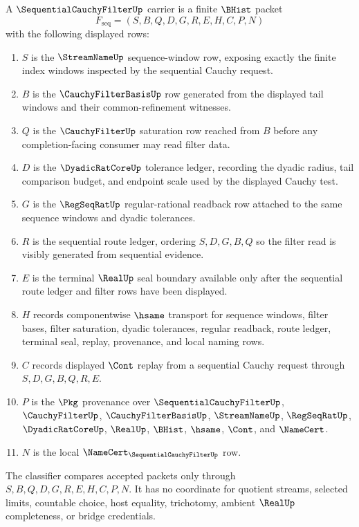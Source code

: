 \begin{definition}
\label{def:sequential-cauchy-filter-carrier}
A $\SequentialCauchyFilterUp$ carrier is a finite $\BHist$ packet
$$
F_{\mathrm{seq}}=(S,B,Q,D,G,R,E,H,C,P,N)
$$
with the following displayed rows:
\begin{enumerate}
\item $S$ is the $\StreamNameUp$ sequence-window row, exposing exactly the finite index windows inspected by the sequential Cauchy request.
\item $B$ is the $\CauchyFilterBasisUp$ row generated from the displayed tail windows and their common-refinement witnesses.
\item $Q$ is the $\CauchyFilterUp$ saturation row reached from $B$ before any completion-facing consumer may read filter data.
\item $D$ is the $\DyadicRatCoreUp$ tolerance ledger, recording the dyadic radius, tail comparison budget, and endpoint scale used by the displayed Cauchy test.
\item $G$ is the $\RegSeqRatUp$ regular-rational readback row attached to the same sequence windows and dyadic tolerances.
\item $R$ is the sequential route ledger, ordering $S,D,G,B,Q$ so the filter read is visibly generated from sequential evidence.
\item $E$ is the terminal $\RealUp$ seal boundary available only after the sequential route ledger and filter rows have been displayed.
\item $H$ records componentwise $\hsame$ transport for sequence windows, filter bases, filter saturation, dyadic tolerances, regular readback, route ledger, terminal seal, replay, provenance, and local naming rows.
\item $C$ records displayed $\Cont$ replay from a sequential Cauchy request through $S,D,G,B,Q,R,E$.
\item $P$ is the $\Pkg$ provenance over $\SequentialCauchyFilterUp$, $\CauchyFilterUp$, $\CauchyFilterBasisUp$, $\StreamNameUp$, $\RegSeqRatUp$, $\DyadicRatCoreUp$, $\RealUp$, $\BHist$, $\hsame$, $\Cont$, and $\NameCert$.
\item $N$ is the local $\NameCert_{\SequentialCauchyFilterUp}$ row.
\end{enumerate}
The classifier compares accepted packets only through $S,B,Q,D,G,R,E,H,C,P,N$. It has no coordinate for quotient streams, selected limits, countable choice, host equality, trichotomy, ambient $\RealUp$ completeness, or bridge credentials.
\end{definition}

